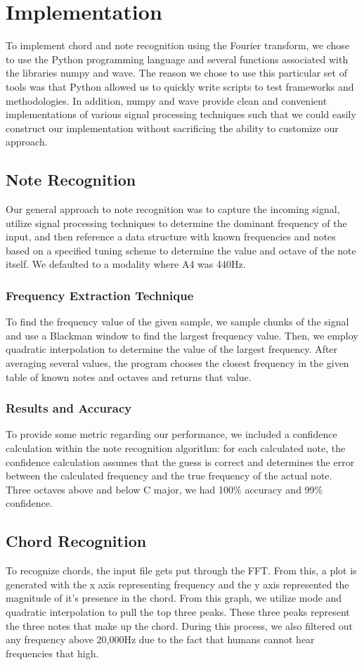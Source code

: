 \documentclass{article}
\begin{document}
\section {Implementation}
To implement chord and note recognition using the Fourier transform, we chose to use the Python programming language and several functions associated with the libraries numpy and wave. The reason we chose to use this particular set of tools was that Python allowed us to quickly write scripts to test frameworks and methodologies. In addition, numpy and wave provide clean and convenient implementations of various signal processing techniques such that we could easily construct our implementation without sacrificing the ability to customize our approach.
\subsection{Note Recognition}
Our general approach to note recognition was to capture the incoming signal, utilize signal processing techniques to determine the dominant frequency of the input, and then reference a data structure with known frequencies and notes based on a specified tuning scheme to determine the value and octave of the note itself. We defaulted to a modality where A4 was 440Hz.
\subsubsection{Frequency Extraction Technique}
To find the frequency value of the given sample, we sample chunks of the signal and use a Blackman window to find the largest frequency value. Then, we employ quadratic interpolation to determine the value of the largest frequency. After averaging several values, the program chooses the closest frequency in the given table of known notes and octaves and returns that value.
\subsubsection{Results and Accuracy}
To provide some metric regarding our performance, we included a confidence calculation within the note recognition algorithm: for each calculated note, the confidence calculation assumes that the guess is correct and determines the error between the calculated frequency and the true frequency of the actual note. Three octaves above and below C major, we had 100\% accuracy and 99\% confidence.

\subsection{Chord Recognition}
To recognize chords, the input file gets put through the FFT. From this, a plot is generated with the x axis representing frequency and the y axis represented the magnitude of it's presence in the chord. From this graph, we utilize mode and quadratic interpolation to pull the top three peaks. These three peaks represent the three notes that make up the chord. During this process, we also filtered out any frequency above 20,000Hz due to the fact that humans cannot hear frequencies that high. 
\end{document}
